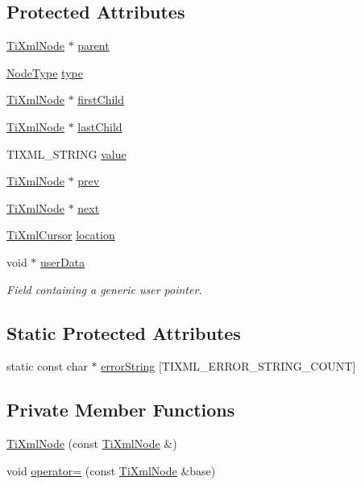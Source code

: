 \subsection*{Protected Attributes}
\begin{DoxyCompactItemize}
\item 
\hyperlink{classTiXmlNode}{TiXmlNode} $\ast$ \hyperlink{classTiXmlNode_a662c4de61244e4fa5bd4e2d8c63143a5}{parent}
\item 
\hyperlink{classTiXmlNode_a836eded4920ab9e9ef28496f48cd95a2}{NodeType} \hyperlink{classTiXmlNode_a2619c6379181c16ba95ae6922e2ca839}{type}
\item 
\hyperlink{classTiXmlNode}{TiXmlNode} $\ast$ \hyperlink{classTiXmlNode_af749fb7f22010b80e8f904c32653d50e}{firstChild}
\item 
\hyperlink{classTiXmlNode}{TiXmlNode} $\ast$ \hyperlink{classTiXmlNode_a5b30756d21b304580d22a841ec9d61f8}{lastChild}
\item 
TIXML\_\-STRING \hyperlink{classTiXmlNode_aead528b3cedc33c16a6c539872c7cc8b}{value}
\item 
\hyperlink{classTiXmlNode}{TiXmlNode} $\ast$ \hyperlink{classTiXmlNode_a9c5370ea2cbfd9f0e0f7b30a57fd68f5}{prev}
\item 
\hyperlink{classTiXmlNode}{TiXmlNode} $\ast$ \hyperlink{classTiXmlNode_a2f329cc993d2d34df76e17dcbb776b45}{next}
\item 
\hyperlink{structTiXmlCursor}{TiXmlCursor} \hyperlink{classTiXmlBase_a0d992580f3bc264909f898e942677a3c}{location}
\item 
void $\ast$ \hyperlink{classTiXmlBase_ab242c01590191f644569fa89a080d97c}{userData}
\begin{DoxyCompactList}\small\item\em Field containing a generic user pointer. \item\end{DoxyCompactList}\end{DoxyCompactItemize}
\subsection*{Static Protected Attributes}
\begin{DoxyCompactItemize}
\item 
static const char $\ast$ \hyperlink{classTiXmlBase_a7ac8feec4100e446b3d78e1ac0659700}{errorString} \mbox{[}TIXML\_\-ERROR\_\-STRING\_\-COUNT\mbox{]}
\end{DoxyCompactItemize}
\subsection*{Private Member Functions}
\begin{DoxyCompactItemize}
\item 
\hyperlink{classTiXmlNode_a5ca3233e05032d121b13fac8273de68d}{TiXmlNode} (const \hyperlink{classTiXmlNode}{TiXmlNode} \&)
\item 
void \hyperlink{classTiXmlNode_a9eb62a8d95b8a98ec2df481cc9e5a7e2}{operator=} (const \hyperlink{classTiXmlNode}{TiXmlNode} \&base)
\end{DoxyCompactItemize}
